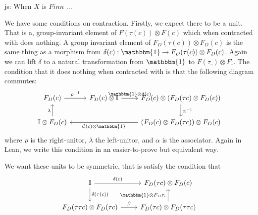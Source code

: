 \documentclass[a4paper, 11pt]{article}
\newcommand{\js}[1]{ {\color{magenta} js:  #1}}
\begin{document}
\js{When $X$ is $Fin n$ ...}

We have some conditions on contraction. Firstly, we expect there to be a unit.
That is a, group-invariant element of 
$F(\tau(c)) \otimes F(c)$ which when contracted with does nothing. 
A group invariant element of $F_D(\tau(c)) \otimes F_D(c)$ is the same thing as a morphism from
$\delta(c) : \mathbbm{1} \to F_D(\tau(c)) \otimes F_D(c)$. Again we can lift $\delta$ to a 
natural transformation from $\mathbbm{1}$ to $F(\tau \_) \otimes F \_$. The condition that it does nothing 
when contracted with is that the following diagram commutes:
\begin{equation}
  \begin{tikzcd}
    F_D(c) \arrow[r, "{\rho^{-1}}"] &  F_D(c) \otimes \mathbb{I} \arrow[r, "{\mathbbm{1}\otimes \delta(c)}"] & F_D(c) \otimes (F_D (\tau c) \otimes F_D(c)) \arrow[d, "{\alpha^{-1}}"] \\
    \mathbb{I} \otimes F_D(c) \arrow[u, "{\lambda}"] &   &(F_D(c) \otimes F_D(\tau c)) \otimes F_D(c) \arrow[ll, "{\mathcal{C}(c)\otimes \mathbbm{1}}"] 
\end{tikzcd}
\end{equation}
where $\rho$ is the right-unitor, $\lambda$ the left-unitor, and $\alpha$ is the associator. 
Again in Lean, we write this condition in an easier-to-prove but equivalent way. 

We want these units to be symmetric, that is satisfy the condition that
\begin{equation} 
  \begin{tikzcd}
    \mathbb{I} \arrow[r, "{\delta(c)}"] \arrow[d, "{\delta(\tau(c))}"] & F_D(\tau c) \otimes F_D(c) \\
    F_D(\tau \tau c) \otimes F_D(\tau c) \arrow[r, "{\beta}"] & F_D(\tau c) \otimes F_D(\tau \tau c) \arrow[u, "{\mathbbm{1} \otimes F_D \tau_c}"]
  \end{tikzcd}
\end{equation}
\end{document}
